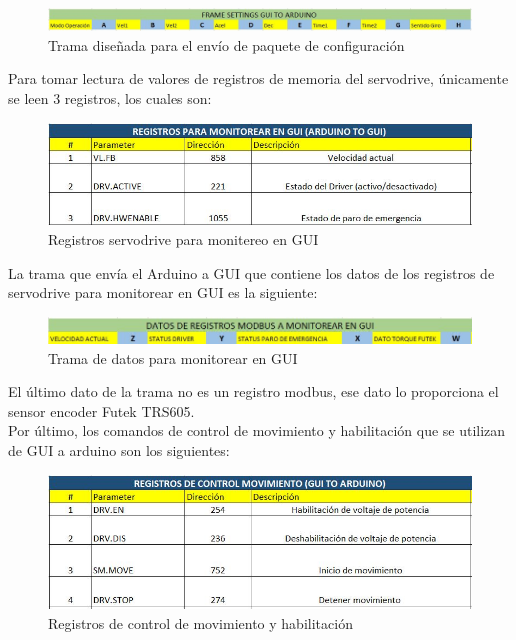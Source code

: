 \documentclass[12pt,titlepage]{article}
\begin{document}
 \begin{figure}[htbp]
\hspace*{0.0cm} 
\includegraphics[scale=0.62]{trama_gui_ard}
\caption{Trama diseñada para el envío de paquete de configuración}
\end{figure}

Para tomar lectura de valores de registros de memoria del servodrive, únicamente se leen 3 registros, los cuales son:
 \begin{figure}[htbp]
\hspace*{1.8cm} 
\includegraphics[scale=0.65]{reg_mon}
\caption{Registros servodrive para monitereo en GUI}
\end{figure}
\newpage
La trama que envía el Arduino a GUI que contiene los datos de los registros de servodrive para monitorear en GUI es la siguiente: \\ 

 \begin{figure}[htbp]
\hspace*{1.1cm} 
\includegraphics[scale=0.68]{trama_mon}
\caption{Trama de datos para monitorear en GUI}
\end{figure}

El último dato de la trama no es un registro modbus, ese dato lo proporciona el sensor encoder Futek TRS605. \\ 

Por último, los comandos de control de movimiento y habilitación que se utilizan de GUI a arduino son los siguientes:  \\
 
 \begin{figure}[htbp]
\hspace*{1.5cm} 
\includegraphics[scale=0.68]{reg_control}
\caption{Registros de control de movimiento y habilitación}
\end{figure}
\end{document}
